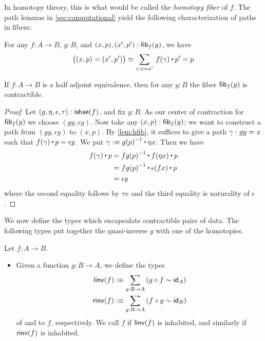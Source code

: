 In homotopy theory, this is what would be called the \emph{homotopy fiber} of $f$.
The path lemmas in \autoref{sec:computational} yield the following characterization of paths in fibers:

\begin{lem}\label{lem:hfib}
  For any $f : A \to B$, $y : B$, and $(x,p),(x',p') : {\mathsf{fib}}_{f}(y)$, we have
  \[ \big((x,p) = (x',p')\big) \eqvsym \sm{\gamma : x = x'} f(\gamma) \ct p' = p \qedhere\]
\end{lem}

\begin{thm}\label{thm:contr-hae}
  If $f:A\to B$ is a half adjoint equivalence, then for any $y:B$ the fiber ${\mathsf{fib}}_{f}(y)$ is contractible.
\end{thm}
\begin{proof}
  Let $(g,\eta,\epsilon,\tau) : \mathsf{ishae}(f)$, and fix $y : B$.
  As our center of contraction for ${\mathsf{fib}}_{f}(y)$ we choose $(gy, \epsilon y)$.
  Now take any $(x,p) : {\mathsf{fib}}_{f}(y)$; we want to construct a path from $(gy, \epsilon y)$ to $(x,p)$.
  By \autoref{lem:hfib}, it suffices to give a path $\gamma : gy =_{} x$ such that $\ap f\gamma \ct p = \epsilon y$.
  We put $\gamma \defeq \opp{g(p)} \ct \eta x$.
  Then we have 
  \begin{align*}
    f(\gamma) \ct p & = \opp{fg(p)} \ct f (\eta x) \ct p \\
    & = \opp{fg(p)} \ct \epsilon(fx) \ct p \\
    & = \epsilon y
  \end{align*}
  where the second equality follows by $\tau x$ and the third equality is naturality of $\epsilon$.
\end{proof}

We now define the types which encapsulate contractible pairs of data.
The following types put together the quasi-inverse $g$ with one of the homotopies.

\begin{defn}\label{defn:linv-rinv}
  Let $f:A\to B$.
  \begin{itemize}
  \item Given a function $g:B\to A$, we define the types 
    \begin{align*}
      \linv(f) &\defeq \sm{g:B\to A} (g\circ f\htpy \idfunc[A])\\
      \rinv(f) &\defeq \sm{g:B\to A} (f\circ g\htpy \idfunc[B])
    \end{align*}
  of 
  and 
  to $f$, respectively.
  We call $f$ 
  if $\mathsf{linv}(f)$ is inhabited, and similarly 
  if $\mathsf{rinv}(f)$ is inhabited.
  \end{itemize}
\end{defn}

